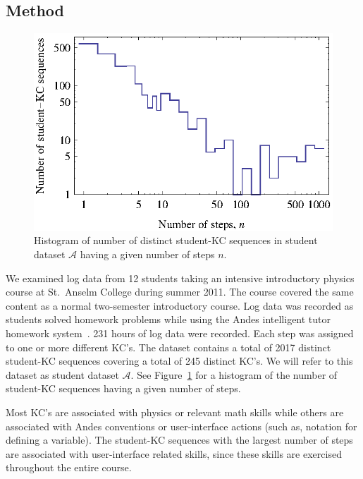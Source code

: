 \documentclass{edm_template}
\begin{document}
\subsection{Method}

\begin{figure}
  \centering \includegraphics{student-kc-length-histogram.eps}
  \caption{Histogram of number of distinct student-KC sequences in student 
    dataset $\mathcal{A}$ having a given number of steps $n$.}
    \label{student-length-histogram}
\end{figure}

We examined log data from 12 students taking an intensive introductory
physics course at St.\ Anselm College during summer 2011.  The course
covered the same content as a normal two-semester introductory course.
Log data was recorded as students solved homework problems while using
the Andes intelligent tutor homework system~\cite{vanlehn_andes_2005}.  
231 hours of log data were recorded.
Each step was assigned to one or more different KC's.  The dataset
contains a total of 2017 distinct student-KC sequences covering a total of
245 distinct KC's.  We will refer to this dataset as student dataset
$\mathcal{A}$.  See Figure~\ref{student-length-histogram} for a
histogram of the number of student-KC sequences having a given number of
steps.

Most KC's are associated with physics
or relevant math skills while others are associated with 
Andes conventions or user-interface actions (such as, notation
for defining a variable).  The student-KC sequences with the largest 
number of steps are associated with user-interface related skills,
since these skills are exercised throughout the entire course. 
\end{document}
